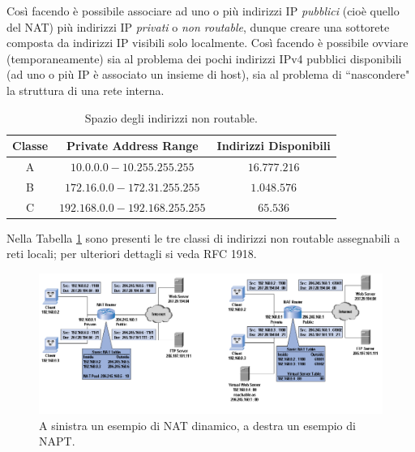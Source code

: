 Così facendo è possibile associare ad uno o più indirizzi IP \textit{pubblici} (cioè quello del NAT) più indirizzi IP \textit{privati} o \textit{non routable}, dunque creare una sottorete composta da indirizzi IP visibili solo localmente. Così facendo è possibile ovviare (temporaneamente) sia al problema dei pochi indirizzi IPv4 pubblici disponibili (ad uno o più IP è associato un insieme di host), sia al problema di \textquotedblleft nascondere" la struttura di una rete interna.
\begin{table}[h]
	\centering
	\begin{tabular}{ccc}
		\toprule[0.5ex]
		Classe & Private Address Range & Indirizzi Disponibili \\
		\midrule
		A & $10.0.0.0 - 10.255.255.255$ & $16.777.216$\\
		B & $172.16.0.0 - 172.31.255.255$ & $1.048.576$\\
		C & $192.168.0.0 - 192.168.255.255$ & $65.536$\\
		\bottomrule[0.5ex]
	\end{tabular}
	\caption{Spazio degli indirizzi non routable.}
	\label{tab:non-routable-space-address}
\end{table}
Nella Tabella \ref{tab:non-routable-space-address} sono presenti le tre classi di indirizzi non routable assegnabili a reti locali; per ulteriori dettagli si veda RFC 1918.
\begin{figure}
	\centering
	\includegraphics[scale = 0.65]{images/dynamic-NAT}
	\caption{A sinistra un esempio di NAT dinamico, a destra un esempio di NAPT.}
	\label{img:dynamic-NAT}
\end{figure}

